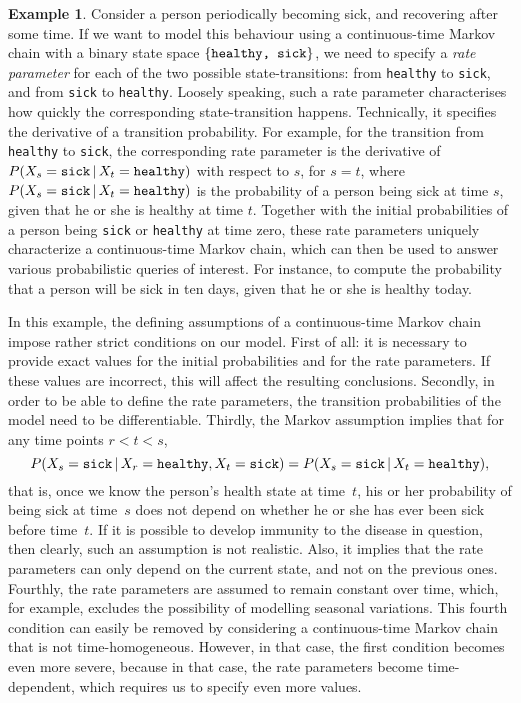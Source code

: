 \documentclass[10pt,a4paper]{paper}
\theoremstyle{definition}
\newtheorem{exmp}{Example}%
\begin{document}
\begin{exmp}\label{ex:health_sick_exmp}
Consider a person periodically becoming sick, and recovering after some time. If we want to model this behaviour using a continuous-time Markov chain with a binary state space $\{\text{\tt healthy, sick}\}$, we need to specify a \emph{rate parameter} for each of the two possible state-transitions: from {\tt healthy} to {\tt sick}, and from {\tt sick} to {\tt healthy}. Loosely speaking, such a rate parameter characterises how quickly the corresponding state-transition happens. Technically, it specifies the derivative of a transition probability. For example, for the transition from {\tt healthy} to {\tt sick}, the corresponding rate parameter is the derivative of $P(X_s={\tt sick}\,\vert\,X_t={\tt healthy})$ with respect to $s$, for $s=t$, where $P(X_s={\tt sick}\,\vert\,X_t={\tt healthy})$ is the probability of a person being sick at time $s$, given that he or she is healthy at time $t$. Together with the initial probabilities of a person being {\tt sick} or {\tt healthy} at time zero, these rate parameters uniquely characterize a continuous-time Markov chain, which can then be used to answer various probabilistic queries of interest.
For instance, to compute the probability that a person will be sick in ten days, given that he or she is healthy today.

In this example, the defining assumptions of a continuous-time Markov chain impose rather strict conditions on our model. 
First of all: it is necessary to provide exact values for the initial probabilities and for the rate parameters. If these values are incorrect, this will affect the resulting conclusions.
Secondly, in order to be able to define the rate parameters, the transition probabilities of the model need to be differentiable.
Thirdly, the Markov assumption implies that for any time points $r<t<s$,
\begin{equation*}
P(X_s={\tt sick}\,\vert\, X_r={\tt healthy}, X_t={\tt sick}) = P(X_s={\tt sick}\,\vert\, X_t={\tt healthy}),
\end{equation*}
that is, once we know the person's health state at time~$t$, his or her probability of being sick at time~$s$ does not depend on whether he or she has ever been sick before time~$t$. If it is possible to develop immunity to the disease in question, then clearly, such an assumption is not realistic. Also, it implies that the rate parameters can only depend on the current state, and not on the previous ones.
Fourthly, the rate parameters are assumed to remain constant over time, which, for example, excludes the possibility of modelling seasonal variations.
This fourth condition can easily be removed by considering a continuous-time Markov chain that is not time-homogeneous. However, in that case, the first condition becomes even more severe, because in that case, the rate parameters become time-dependent, which requires us to specify even more values.


\end{exmp}
\end{document}
